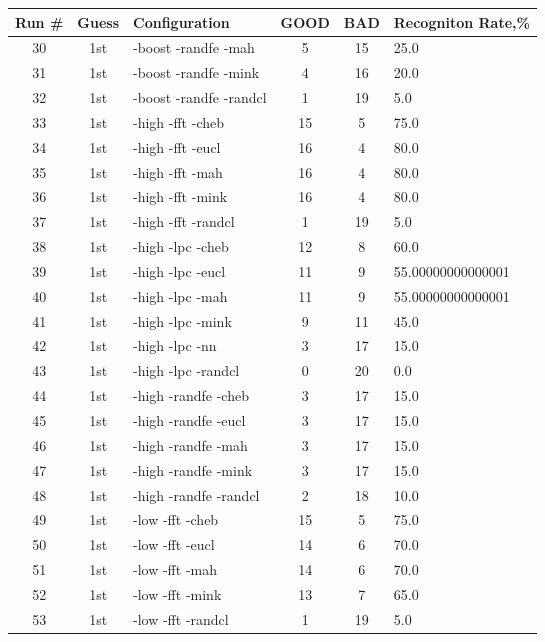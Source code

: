 \begin{table}
\centering
\begin{tabular}{|c|c|l|c|c|l|} \hline
Run \# & Guess & Configuration & GOOD & BAD & Recogniton Rate,\%\\ \hline\hline
30 & 1st & -boost -randfe -mah & 5 & 15 & 25.0\\ \hline
31 & 1st & -boost -randfe -mink & 4 & 16 & 20.0\\ \hline
32 & 1st & -boost -randfe -randcl & 1 & 19 & 5.0\\ \hline
33 & 1st & -high -fft -cheb & 15 & 5 & 75.0\\ \hline
34 & 1st & -high -fft -eucl & 16 & 4 & 80.0\\ \hline
35 & 1st & -high -fft -mah & 16 & 4 & 80.0\\ \hline
36 & 1st & -high -fft -mink & 16 & 4 & 80.0\\ \hline
37 & 1st & -high -fft -randcl & 1 & 19 & 5.0\\ \hline
38 & 1st & -high -lpc -cheb & 12 & 8 & 60.0\\ \hline
39 & 1st & -high -lpc -eucl & 11 & 9 & 55.00000000000001\\ \hline
40 & 1st & -high -lpc -mah & 11 & 9 & 55.00000000000001\\ \hline
41 & 1st & -high -lpc -mink & 9 & 11 & 45.0\\ \hline
42 & 1st & -high -lpc -nn & 3 & 17 & 15.0\\ \hline
43 & 1st & -high -lpc -randcl & 0 & 20 & 0.0\\ \hline
44 & 1st & -high -randfe -cheb & 3 & 17 & 15.0\\ \hline
45 & 1st & -high -randfe -eucl & 3 & 17 & 15.0\\ \hline
46 & 1st & -high -randfe -mah & 3 & 17 & 15.0\\ \hline
47 & 1st & -high -randfe -mink & 3 & 17 & 15.0\\ \hline
48 & 1st & -high -randfe -randcl & 2 & 18 & 10.0\\ \hline
49 & 1st & -low -fft -cheb & 15 & 5 & 75.0\\ \hline
50 & 1st & -low -fft -eucl & 14 & 6 & 70.0\\ \hline
51 & 1st & -low -fft -mah & 14 & 6 & 70.0\\ \hline
52 & 1st & -low -fft -mink & 13 & 7 & 65.0\\ \hline
53 & 1st & -low -fft -randcl & 1 & 19 & 5.0\\ \hline

\end{tabular}
\end{table}
